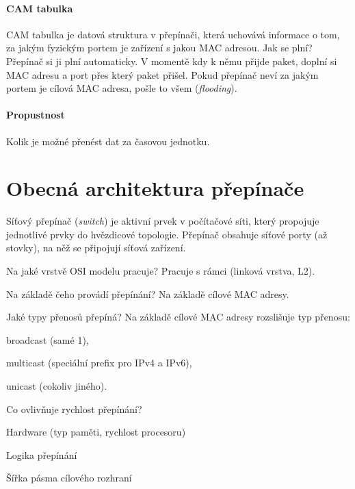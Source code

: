 
\paragraph*{CAM tabulka} CAM tabulka je datová struktura v přepínači, která uchovává informace o tom, za jakým fyzickým portem je zařízení s jakou MAC adresou. Jak se plní? Přepínač si ji plní automaticky. V momentě kdy k němu přijde paket, doplní si MAC adresu a port přes který paket přišel. Pokud přepínač neví za jakým portem je cílová MAC adresa, pošle to všem (\textit{flooding}).

\paragraph*{Propustnost} Kolik je možné přenést dat za časovou jednotku.


\section{Obecná architektura přepínače}

Síťový přepínač (\textit{switch}) je aktivní prvek v počítačové síti, který propojuje jednotlivé prvky do hvězdicové topologie. Přepínač obsahuje síťové porty (až stovky), na něž se připojují síťová zařízení. \begin{compactitem}
    \item Na jaké vrstvě OSI modelu pracuje? Pracuje s rámci (linková vrstva, L2).
    \item Na základě čeho provádí přepínání? Na základě cílové MAC adresy.
    \item Jaké typy přenosů přepíná? Na základě cílové MAC adresy rozslišuje typ přenosu: \begin{compactitem}
        \item broadcast (samé 1),
        \item multicast (speciální prefix pro IPv4 a IPv6),
        \item unicast (cokoliv jiného).
    \end{compactitem}
    \item Co ovlivňuje rychlost přepínání? \begin{compactitem}
        \item Hardware (typ paměti, rychlost procesoru)
        \item Logika přepínání
        \item Šířka pásma cílového rozhraní
    \end{compactitem}
\end{compactitem}

